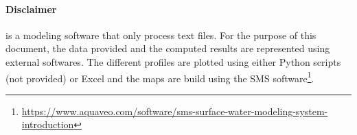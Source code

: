 \documentclass[openany]{book}
\newcommand{\rootpath}{../../..}
\begin{document}
\fancyhf{}
\fancyhead[LE]{\small\truncate{15cm}{\leftmark}}
\fancyhead[LO]{\small\truncate{15cm}{\rightmark}}
\fancyfoot[C]{\thepage}  

 \makeatletter
 \let\ps@plain\ps@fancy
 \makeatother
 



\paragraph*{Disclaimer}
\swdd is a modeling software that only process text files. For the purpose of this document, the data provided and the computed results are 
represented using external softwares. The different profiles are plotted using either Python scripts (not provided) or 
Excel and the maps are build using the SMS software\footnote{\url{https://www.aquaveo.com/software/sms-surface-water-modeling-system-introduction}}.






%
%
%
\end{document}
